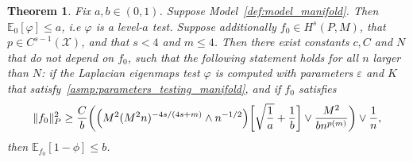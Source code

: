 \documentclass{article}
\newcommand{\1}{\mathbf{1}}
\newcommand{\mc}[1]{\mathcal{#1}}
\newcommand{\Ebb}{\mathbb{E}}
\theoremstyle{alden}
\theoremstyle{aldenthm}
\newtheorem{theorem}{Theorem}
\theoremstyle{definition}
\theoremstyle{remark}
\begin{document}
\begin{theorem}
	\label{thm:laplacian_eigenmaps_testing_manifold}
	Fix $a,b \in (0,1)$. Suppose Model~\ref{def:model_manifold}. Then $\mathbb{E}_0[\varphi] \leq a$, i.e $\varphi$ is a level-$a$ test. Suppose additionally $f_0 \in H^s(P,M)$, that $p \in C^{s-1}(\mc{X})$, and that $s < 4$ and $m \leq 4$. Then there exist constants $c,C$ and $N$ that do not depend on $f_0$, such that the following statement holds for all $n$ larger than $N$: if the Laplacian eigenmaps test $\varphi$ is computed with parameters $\varepsilon$ and $K$ that satisfy~\ref{asmp:parameters_testing_manifold}, and if $f_0$ satisfies
	\begin{equation}
	\label{eqn:laplacian_eigenmaps_testing_criticalradius_manifold}
	\|f_0\|_P^2 \geq \frac{C}{b}\biggl(\Bigl(M^2(M^2n)^{-4s/(4s + m) } \wedge n^{-1/2}\Bigr)\biggl[\sqrt{\frac{1}{a}} + \frac{1}{b}\biggr] \vee \frac{M^2}{b n^{p(m)}} \biggr) \vee \frac{1}{n},
	\end{equation}
	then $\Ebb_{f_0}[1 - \phi] \leq b$.
\end{theorem}
\end{document}

